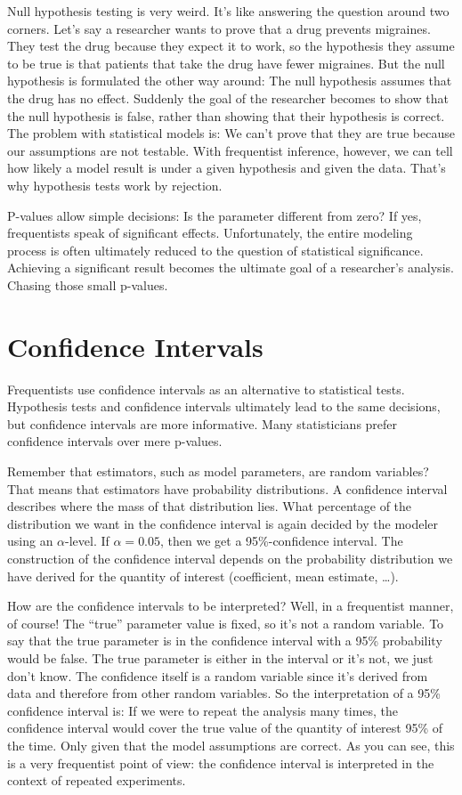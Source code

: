 \documentclass[
  10pt,
]{scrbook}
\begin{document}
Null hypothesis testing is very weird.
It's like answering the question around two corners.
Let's say a researcher wants to prove that a drug prevents migraines.
They test the drug because they expect it to work, so the hypothesis they assume to be true is that patients that take the drug have fewer migraines.
But the null hypothesis is formulated the other way around:
The null hypothesis assumes that the drug has no effect.
Suddenly the goal of the researcher becomes to show that the null hypothesis is false, rather than showing that their hypothesis is correct.
The problem with statistical models is: We can't prove that they are true because our assumptions are not testable.
With frequentist inference, however, we can tell how likely a model result is under a given hypothesis and given the data.
That's why hypothesis tests work by rejection.

P-values allow simple decisions: Is the parameter different from zero?
If yes, frequentists speak of significant effects.
Unfortunately, the entire modeling process is often ultimately reduced to the question of statistical significance.
Achieving a significant result becomes the ultimate goal of a researcher's analysis.
Chasing those small p-values.

\hypertarget{confidence-intervals}{%
\section{Confidence Intervals}\label{confidence-intervals}}

Frequentists use confidence intervals as an alternative to statistical tests.
Hypothesis tests and confidence intervals ultimately lead to the same decisions, but confidence intervals are more informative.
Many statisticians prefer confidence intervals over mere p-values.

Remember that estimators, such as model parameters, are random variables?
That means that estimators have probability distributions.
A confidence interval describes where the mass of that distribution lies.
What percentage of the distribution we want in the confidence interval is again decided by the modeler using an \(\alpha\)-level.
If \(\alpha = 0.05\), then we get a 95\%-confidence interval.
The construction of the confidence interval depends on the probability distribution we have derived for the quantity of interest (coefficient, mean estimate, \ldots).

How are the confidence intervals to be interpreted?
Well, in a frequentist manner, of course!
The ``true'' parameter value is fixed, so it's not a random variable.
To say that the true parameter is in the confidence interval with a 95\% probability would be false.
The true parameter is either in the interval or it's not, we just don't know.
The confidence itself is a random variable since it's derived from data and therefore from other random variables.
So the interpretation of a 95\% confidence interval is:
If we were to repeat the analysis many times, the confidence interval would cover the true value of the quantity of interest 95\% of the time.
Only given that the model assumptions are correct.
As you can see, this is a very frequentist point of view: the confidence interval is interpreted in the context of repeated experiments.
\end{document}
